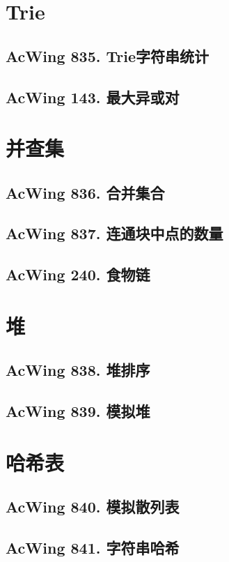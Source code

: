 \section{Trie}
\subsection{AcWing 835. Trie字符串统计}
\subsection{AcWing 143. 最大异或对}

\section{并查集}
\subsection{AcWing 836. 合并集合}
\subsection{AcWing 837. 连通块中点的数量}
\subsection{AcWing 240. 食物链}

\section{堆}
\subsection{AcWing 838. 堆排序}
\subsection{AcWing 839. 模拟堆}

\section{哈希表}
\subsection{AcWing 840. 模拟散列表}
\subsection{AcWing 841. 字符串哈希}